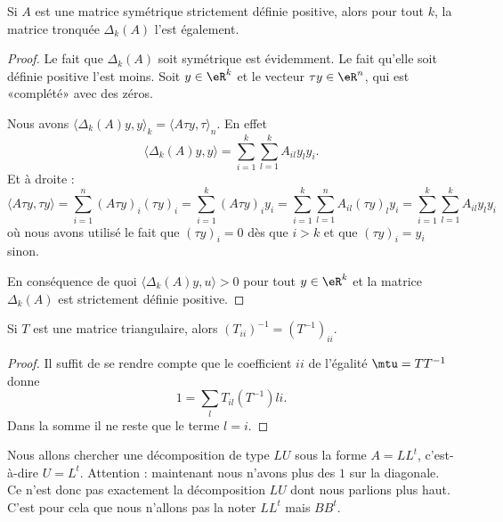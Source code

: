 \begin{lemma}       \label{LEMooVEIYooZbShQb}
	Si \( A\) est une matrice symétrique strictement définie positive, alors pour tout \( k\), la matrice tronquée \( \Delta_k(A)\) l'est également.
\end{lemma}

\begin{proof}
	Le fait que \( \Delta_k(A)\) soit symétrique est évidemment. Le fait qu'elle soit définie positive l'est moins. Soit \( y\in \eR^k\) et le vecteur \( \tau y\in \eR^n\), qui est «complété» avec des zéros.

	Nous avons \( \langle \Delta_k(A)y, y\rangle_k=\langle A\tau y, \tau \rangle_n\). En effet
	\begin{equation}
		\langle \Delta_k(A)y, y\rangle =\sum_{i=1}^k\sum_{l=1}^kA_{il}y_ly_i.
	\end{equation}
	Et à droite :
	\begin{equation}
		\langle A\tau y, \tau y\rangle =\sum_{i=1}^n(A\tau y)_i(\tau y)_i
		=\sum_{i=1}^k(A\tau y)_i y_i
		=\sum_{i=1}^k\sum_{l=1}^n A_{il}(\tau y)_ly_i
		=\sum_{i=1}^k\sum_{l=1}^k A_{il}y_ly_i
	\end{equation}
	où nous avons utilisé le fait que \( (\tau y)_i=0\) dès que \( i>k\) et que \( (\tau y)_i=y_i\) sinon.

	En conséquence de quoi \( \langle \Delta_k(A)y, u\rangle >0\) pour tout \( y\in \eR^k\) et la matrice \( \Delta_k(A)\) est strictement définie positive.
\end{proof}

\begin{lemma}       \label{LEMooLBQLooIYvacH}
	Si \( T\) est une matrice triangulaire, alors \( (T_{ii})^{-1}=(T^{-1})_{ii}\).
\end{lemma}

\begin{proof}
	Il suffit de se rendre compte que le coefficient \( ii\) de l'égalité \( \mtu=TT^{-1}\) donne
	\begin{equation}
		1=\sum_lT_{il}(T^{-1})li.
	\end{equation}
	Dans la somme il ne reste que le terme \( l=i\).
\end{proof}

Nous allons chercher une décomposition de type \( LU\) sous la forme \( A=LL^t\), c'est-à-dire \( U=L^t\). Attention : maintenant nous n'avons plus des \( 1\) sur la diagonale. Ce n'est donc pas exactement la décomposition \( LU\) dont nous parlions plus haut. C'est pour cela que nous n'allons pas la noter \( LL^t\) mais \( BB^t\).

